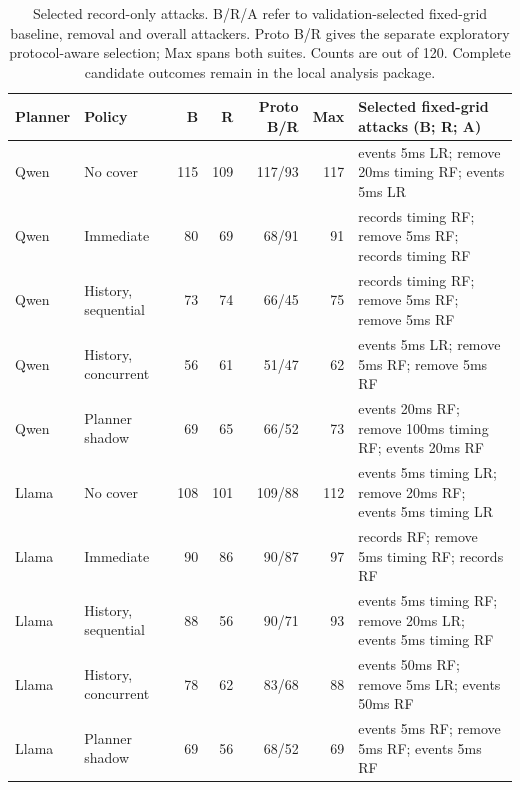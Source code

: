 \begin{table}[t]\centering\small
\caption{Selected record-only attacks. B/R/A refer to validation-selected fixed-grid baseline, removal and overall attackers. Proto B/R gives the separate exploratory protocol-aware selection; Max spans both suites. Counts are out of 120. Complete candidate outcomes remain in the local analysis package.}\label{tab:no-call-results}
\begin{tabularx}{\textwidth}{@{}llrrrrY@{}}\toprule Planner & Policy & B & R & Proto B/R & Max & Selected fixed-grid attacks (B; R; A) \\\midrule
Qwen & No cover & 115 & 109 & 117/93 & 117 & events 5ms LR; remove 20ms timing RF; events 5ms LR \\
Qwen & Immediate & 80 & 69 & 68/91 & 91 & records timing RF; remove 5ms RF; records timing RF \\
Qwen & History, sequential & 73 & 74 & 66/45 & 75 & records timing RF; remove 5ms RF; remove 5ms RF \\
Qwen & History, concurrent & 56 & 61 & 51/47 & 62 & events 5ms LR; remove 5ms RF; remove 5ms RF \\
Qwen & Planner shadow & 69 & 65 & 66/52 & 73 & events 20ms RF; remove 100ms timing RF; events 20ms RF \\
Llama & No cover & 108 & 101 & 109/88 & 112 & events 5ms timing LR; remove 20ms RF; events 5ms timing LR \\
Llama & Immediate & 90 & 86 & 90/87 & 97 & records RF; remove 5ms timing RF; records RF \\
Llama & History, sequential & 88 & 56 & 90/71 & 93 & events 5ms timing RF; remove 20ms LR; events 5ms timing RF \\
Llama & History, concurrent & 78 & 62 & 83/68 & 88 & events 50ms RF; remove 5ms LR; events 50ms RF \\
Llama & Planner shadow & 69 & 56 & 68/52 & 69 & events 5ms RF; remove 5ms RF; events 5ms RF \\
\bottomrule\end{tabularx}\end{table}

